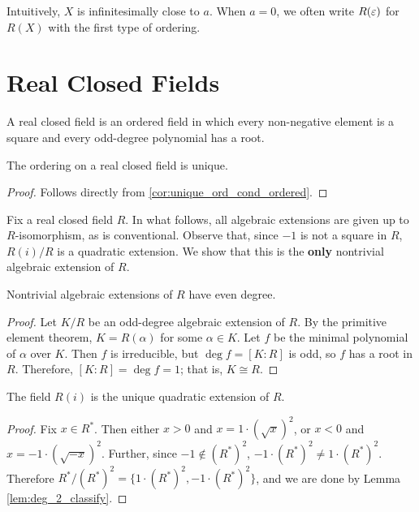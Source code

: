 Intuitively, $X$ is infinitesimally close to $a$. When $a=0$, we often write $R(\varepsilon)$ for $R(X)$ with the first type of ordering.

\section{Real Closed Fields}

\begin{definition}
  \label{def:RCF}
  \leanok
  A real closed field is an ordered field in which every non-negative element is a square and every odd-degree polynomial has a root.
\end{definition}

\begin{lemma}
  \label{lem:RCF_ord_unique}
  The ordering on a real closed field is unique.
\end{lemma}
\begin{proof}
  Follows directly from \ref{cor:unique_ord_cond_ordered}.
\end{proof}

Fix a real closed field $R$. In what follows, all algebraic extensions are given up to $R$-isomorphism, as is conventional. Observe that, since $-1$ is not a square in $R$, $R(i)/R$ is a quadratic extension. We show that this is the \textbf{only} nontrivial algebraic extension of $R$.

\begin{lemma}
  \label{lem:alg_ext_odd_deg}
  Nontrivial algebraic extensions of $R$ have even degree.
\end{lemma}
\begin{proof}
  Let $K/R$ be an odd-degree algebraic extension of $R$. By the primitive element theorem, $K=R(\alpha)$ for some $\alpha\in K$. Let $f$ be the minimal polynomial of $\alpha$ over $K$. Then $f$ is irreducible, but $\deg f=[K:R]$ is odd, so $f$ has a root in $R$. Therefore, $[K:R]=\deg f=1$; that is, $K\cong R$.
\end{proof}

\begin{lemma}
  \label{lem:ext_deg_2}
  The field $R(i)$ is the unique quadratic extension of $R$.
\end{lemma}
\begin{proof}
  Fix $x\in R^*$. Then either $x>0$ and $x=1\cdot(\sqrt{x})^2$, or $x<0$ and $x=-1\cdot(\sqrt{-x})^2$. Further, since $-1\notin(R^*)^2$, $-1\cdot(R^*)^2\neq 1\cdot(R^*)^2$. Therefore $R^*/{(R^*)^2}=\{1\cdot(R^*)^2,-1\cdot(R^*)^2\}$, and we are done by Lemma \ref{lem:deg_2_classify}.
\end{proof}

